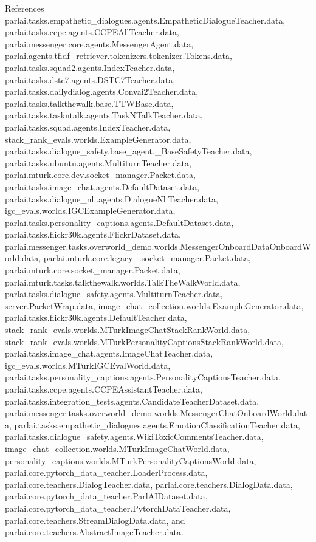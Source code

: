 References parlai.\+tasks.\+empathetic\+\_\+dialogues.\+agents.\+Empathetic\+Dialogue\+Teacher.\+data, parlai.\+tasks.\+ccpe.\+agents.\+C\+C\+P\+E\+All\+Teacher.\+data, parlai.\+messenger.\+core.\+agents.\+Messenger\+Agent.\+data, parlai.\+agents.\+tfidf\+\_\+retriever.\+tokenizers.\+tokenizer.\+Tokens.\+data, parlai.\+tasks.\+squad2.\+agents.\+Index\+Teacher.\+data, parlai.\+tasks.\+dstc7.\+agents.\+D\+S\+T\+C7\+Teacher.\+data, parlai.\+tasks.\+dailydialog.\+agents.\+Convai2\+Teacher.\+data, parlai.\+tasks.\+talkthewalk.\+base.\+T\+T\+W\+Base.\+data, parlai.\+tasks.\+taskntalk.\+agents.\+Task\+N\+Talk\+Teacher.\+data, parlai.\+tasks.\+squad.\+agents.\+Index\+Teacher.\+data, stack\+\_\+rank\+\_\+evals.\+worlds.\+Example\+Generator.\+data, parlai.\+tasks.\+dialogue\+\_\+safety.\+base\+\_\+agent.\+\_\+\+Base\+Safety\+Teacher.\+data, parlai.\+tasks.\+ubuntu.\+agents.\+Multiturn\+Teacher.\+data, parlai.\+mturk.\+core.\+dev.\+socket\+\_\+manager.\+Packet.\+data, parlai.\+tasks.\+image\+\_\+chat.\+agents.\+Default\+Dataset.\+data, parlai.\+tasks.\+dialogue\+\_\+nli.\+agents.\+Dialogue\+Nli\+Teacher.\+data, igc\+\_\+evals.\+worlds.\+I\+G\+C\+Example\+Generator.\+data, parlai.\+tasks.\+personality\+\_\+captions.\+agents.\+Default\+Dataset.\+data, parlai.\+tasks.\+flickr30k.\+agents.\+Flickr\+Dataset.\+data, parlai.\+messenger.\+tasks.\+overworld\+\_\+demo.\+worlds.\+Messenger\+Onboard\+Data\+Onboard\+World.\+data, parlai.\+mturk.\+core.\+legacy\+\_.\+socket\+\_\+manager.\+Packet.\+data, parlai.\+mturk.\+core.\+socket\+\_\+manager.\+Packet.\+data, parlai.\+mturk.\+tasks.\+talkthewalk.\+worlds.\+Talk\+The\+Walk\+World.\+data, parlai.\+tasks.\+dialogue\+\_\+safety.\+agents.\+Multiturn\+Teacher.\+data, server.\+Packet\+Wrap.\+data, image\+\_\+chat\+\_\+collection.\+worlds.\+Example\+Generator.\+data, parlai.\+tasks.\+flickr30k.\+agents.\+Default\+Teacher.\+data, stack\+\_\+rank\+\_\+evals.\+worlds.\+M\+Turk\+Image\+Chat\+Stack\+Rank\+World.\+data, stack\+\_\+rank\+\_\+evals.\+worlds.\+M\+Turk\+Personality\+Captions\+Stack\+Rank\+World.\+data, parlai.\+tasks.\+image\+\_\+chat.\+agents.\+Image\+Chat\+Teacher.\+data, igc\+\_\+evals.\+worlds.\+M\+Turk\+I\+G\+C\+Eval\+World.\+data, parlai.\+tasks.\+personality\+\_\+captions.\+agents.\+Personality\+Captions\+Teacher.\+data, parlai.\+tasks.\+ccpe.\+agents.\+C\+C\+P\+E\+Assistant\+Teacher.\+data, parlai.\+tasks.\+integration\+\_\+tests.\+agents.\+Candidate\+Teacher\+Dataset.\+data, parlai.\+messenger.\+tasks.\+overworld\+\_\+demo.\+worlds.\+Messenger\+Chat\+Onboard\+World.\+data, parlai.\+tasks.\+empathetic\+\_\+dialogues.\+agents.\+Emotion\+Classification\+Teacher.\+data, parlai.\+tasks.\+dialogue\+\_\+safety.\+agents.\+Wiki\+Toxic\+Comments\+Teacher.\+data, image\+\_\+chat\+\_\+collection.\+worlds.\+M\+Turk\+Image\+Chat\+World.\+data, personality\+\_\+captions.\+worlds.\+M\+Turk\+Personality\+Captions\+World.\+data, parlai.\+core.\+pytorch\+\_\+data\+\_\+teacher.\+Loader\+Process.\+data, parlai.\+core.\+teachers.\+Dialog\+Teacher.\+data, parlai.\+core.\+teachers.\+Dialog\+Data.\+data, parlai.\+core.\+pytorch\+\_\+data\+\_\+teacher.\+Parl\+A\+I\+Dataset.\+data, parlai.\+core.\+pytorch\+\_\+data\+\_\+teacher.\+Pytorch\+Data\+Teacher.\+data, parlai.\+core.\+teachers.\+Stream\+Dialog\+Data.\+data, and parlai.\+core.\+teachers.\+Abstract\+Image\+Teacher.\+data.

